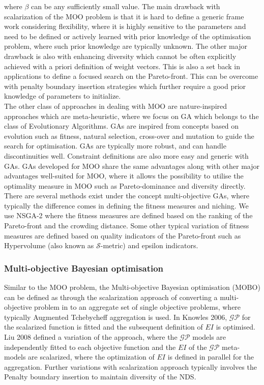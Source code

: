 where $\beta$ can be any sufficiently small value. The main drawback with scalarization of the MOO problem is that it is hard to define a generic frame work considering flexibility, where it is highly sensitive to the parameters and need to be defined or actively learned with prior knowledge of the optimisation problem, where such prior knowledge are typically unknown. The other major drawback is also with enhancing diversity which cannot be often explicitly achieved with a priori definition of weight vectors. This is also a set back in applications to define a focused search on the Pareto-front. This can be overcome with penalty boundary insertion strategies which further require a good prior knowledge of parameters to initialize.\\

The other class of approaches in dealing with MOO are nature-inspired approaches which are meta-heuristic, where we focus on GA which belongs to the class of Evolutionary Algorithms. GAs are inspired from concepts based on evolution such as fitness, natural selection, cross-over and mutation to guide the search for optimisation. GAs are typically more robust, and can handle discontinuities well. Constraint definitions are also more easy and generic with GAs.  GAs developed for MOO share the same advantages along with other major advantages well-suited for MOO, where it allows the possibility to utilise the optimality measure in MOO such as Pareto-dominance and diversity directly. There are several methods exist under the concept multi-objective GAs, where typically the difference comes in defining the fitness measures and niching. We use NSGA-2 where the fitness measures are defined based on the ranking of the Pareto-front and the crowding distance. Some other typical variation of fitness measures are defined based on quality indicators of the Pareto-front such as Hypervolume (also known as $\mathcal{S}$-metric) and epsilon indicators. \\



\subsubsection{Multi-objective Bayesian optimisation}


Similar to the MOO problem, the Multi-objective Bayesian optimisation (MOBO) can be defined as through the scalarization approach of converting a multi-objective problem in to an aggregate set of single objective problems, where typically Augmented Tchebycheff aggregation is used. In {\color{red} Knowles 2006}, $\mathcal{GP}$ for the scalarized function is fitted and the subsequent definition of $EI$ is optimised.  {\color{red} Liu 2008} defined a variation of the approach, where the $\mathcal{GP}$ models are independently fitted to each objective function and the $EI$ of the $\mathcal{GP}$ meta-models are scalarized, where the optimization of $EI$ is defined in parallel for the aggregation. Further variations with scalarization approach typically involves the Penalty boundary insertion to maintain diversity of the NDS.\\

